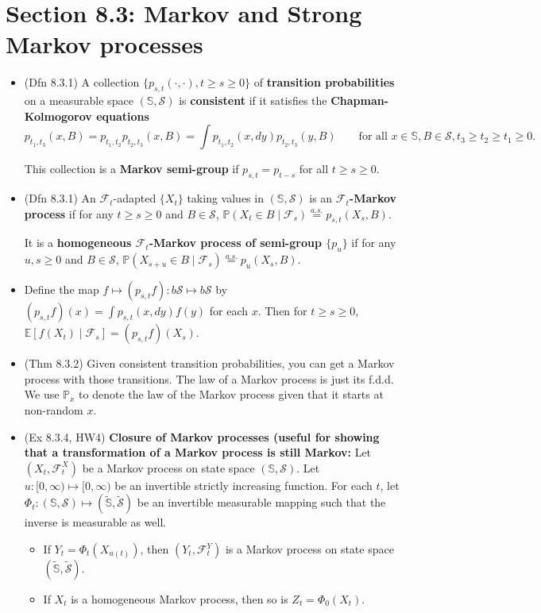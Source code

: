 \documentclass[twoside]{article}
\newcommand{\dis}{\displaystyle}
\newcommand\bbE{\mathbb{E}}
\newcommand\bbP{\mathbb{P}}
\newcommand\bbS{\mathbb{S}}
\newcommand\calF{\mathcal{F}}
\newcommand\calS{\mathcal{S}}
\begin{document}
\section*{Section 8.3: Markov and Strong Markov processes}
\begin{itemize}
\item (Dfn 8.3.1) A collection $\{p_{s,t}(\cdot, \cdot), t \geq s \geq 0\}$ of \textbf{transition probabilities} on a measurable space $(\bbS, \calS)$ is \textbf{consistent} if it satisfies the \textbf{Chapman-Kolmogorov equations} 
\[ p_{t_1, t_3}(x,B) = p_{t_1, t_2}p_{t_2, t_3}(x,B) = \int p_{t_1, t_2}(x, dy)p_{t_2, t_3}(y,B) \qquad\text{for all } x \in \bbS, B \in \calS, t_3 \geq t_2 \geq t_1 \geq 0. \]

This collection is a \textbf{Markov semi-group} if $p_{s,t} = p_{t-s}$ for all $t \geq s \geq 0$.

\item (Dfn 8.3.1) An $\calF_t$-adapted $\{ X_t \}$ taking values in $(\bbS, \calS)$ is an \textbf{$\calF_t$-Markov process} if for any $t \geq s \geq 0$ and $B \in \calS$, $\bbP (X_t \in B \mid \calF_s) \stackrel{a.s.}{=} p_{s,t}(X_s, B)$.

It is a \textbf{homogeneous $\calF_t$-Markov process of semi-group $\{ p_u\}$} if for any $u, s \geq 0$ and $B \in \calS$, $\bbP (X_{s+u} \in B \mid \calF_s) \stackrel{a.s.}{=} p_u(X_s, B)$.

\item Define the map $f \mapsto (p_{s,t}f): b\calS \mapsto b\calS$ by $(p_{s,t}f)(x) = \dis\int p_{s,t}(x, dy) f(y)$ for each $x$. Then for $t \geq s \geq 0$, $\bbE [f(X_t) \mid \calF_s] = (p_{s,t}f)(X_s)$.

\item (Thm 8.3.2) Given consistent transition probabilities, you can get a Markov process with those transitions. The law of a Markov process is just its f.d.d. We use $\bbP_x$ to denote the law of the Markov process given that it starts at non-random $x$.

\item (Ex 8.3.4, HW4) \textbf{Closure of Markov processes (useful for showing that a transformation of a Markov process is still Markov:} Let $(X_t, \calF_t^X)$ be a Markov process on state space $(\bbS, \calS)$. Let $u: [0,\infty) \mapsto [0,\infty)$ be an invertible strictly increasing function. For each $t$, let $\Phi_t: (\bbS, \calS) \mapsto (\tilde{\bbS}, \tilde{\calS})$ be an invertible measurable mapping such that the inverse is measurable as well.
\begin{itemize}
\item If $Y_t = \Phi_t(X_{u(t)})$, then $(Y_t, \calF_t^Y)$ is a Markov process on state space $(\tilde{\bbS}, \tilde{\calS})$.
\item If $X_t$ is a homogeneous Markov process, then so is $Z_t = \Phi_0(X_t)$.
\end{itemize}


\end{itemize}
\end{document}
